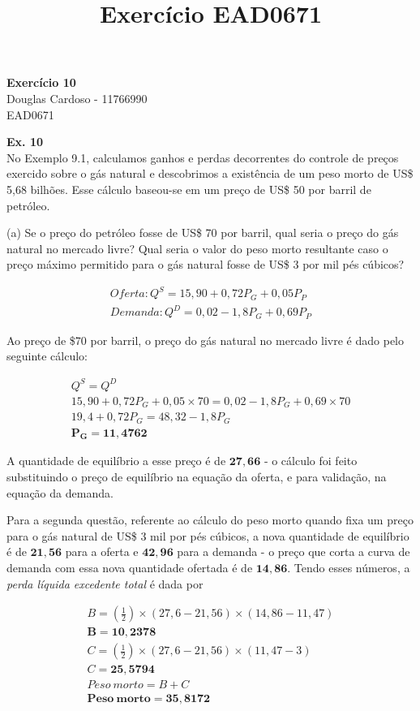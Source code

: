 \documentclass[12pt]{article}
\begin{document}
\title{Exercício EAD0671}


\begin{center}
    {\LARGE \bf Exercício 10} \\
    
    {\large Douglas Cardoso - 11766990}\\
EAD0671
\end{center}

\textbf{Ex. 10}\\
No Exemplo 9.1, calculamos ganhos e perdas decorrentes do controle de preços exercido sobre o gás natural e descobrimos a existência de um peso morto de US\$ 5,68 bilhões. Esse cálculo baseou-se em um preço de US\$ 50 por barril de petróleo.

(a) Se o preço do petróleo fosse de US\$ 70 por barril, qual seria o preço do gás natural no mercado livre? Qual seria o valor do peso morto resultante caso o preço máximo permitido para o gás natural fosse de US\$ 3 por mil pés cúbicos?

\begin{align*}
Oferta: Q^S = 15,90 + 0,72P_G + 0,05P_P \\
Demanda: Q^D = 0,02 - 1,8P_G + 0,69P_P
\end{align*}

Ao preço de \$70 por barril, o preço do gás natural no mercado livre é dado pelo seguinte cálculo:

\begin{gather*}
      Q^S = Q^D \\
    15,90 + 0,72P_G + 0,05 \times 70 = 0,02 - 1,8P_G + 0,69 \times 70 \\
    19,4 + 0,72P_G = 48,32 - 1,8P_G \\
    \bm{P_G = 11,4762}
\end{gather*}
 
A quantidade de equilíbrio a esse preço é de $\bm{27,66}$ - o cálculo foi feito substituindo o preço de equilíbrio na equação da oferta, e para validação, na equação da demanda.

Para a segunda questão, referente ao cálculo do peso morto quando fixa um preço para o gás natural de US\$ 3 mil por pés cúbicos, a nova quantidade de equilíbrio é de $\bm{21,56}$ para a oferta e $\bm{42,96}$ para a demanda - o preço que corta a curva de demanda com essa nova quantidade ofertada é de $\bm{14,86}$. Tendo esses números, a \textit{perda líquida excedente total} é dada por

\begin{gather*}
    B = (\frac{1}{2}) \times (27,6 - 21,56) \times (14,86 - 11,47) \\
    \bm{B = 10,2378} \\
    C = (\frac{1}{2}) \times (27,6 - 21,56) \times (11,47 - 3) \\
    C = \bm{25,5794} \\
    Peso\ morto = B + C \\
    \bm{Peso\ morto = 35,8172}
\end{gather*}
\end{document}
